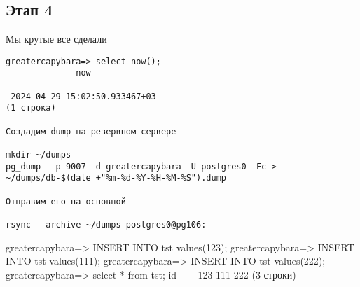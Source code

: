 \documentclass{article}
\begin{document}
\subsection{Этап 4}

Мы крутые все сделали

\begin{verbatim}
greatercapybara=> select now();
              now
-------------------------------
 2024-04-29 15:02:50.933467+03
(1 строка)

Создадим dump на резервном сервере

mkdir ~/dumps
pg_dump  -p 9007 -d greatercapybara -U postgres0 -Fc > ~/dumps/db-$(date +"%m-%d-%Y-%H-%M-%S").dump

Отправим его на основной

rsync --archive ~/dumps postgres0@pg106:
\end{verbatim}
    greatercapybara=> INSERT INTO tst values(123);
    greatercapybara=> INSERT INTO tst values(111);
    greatercapybara=> INSERT INTO tst values(222);
    greatercapybara=> select * from tst;
     id
    -----
     123
     111
     222
    (3 строки)
\end{document}
